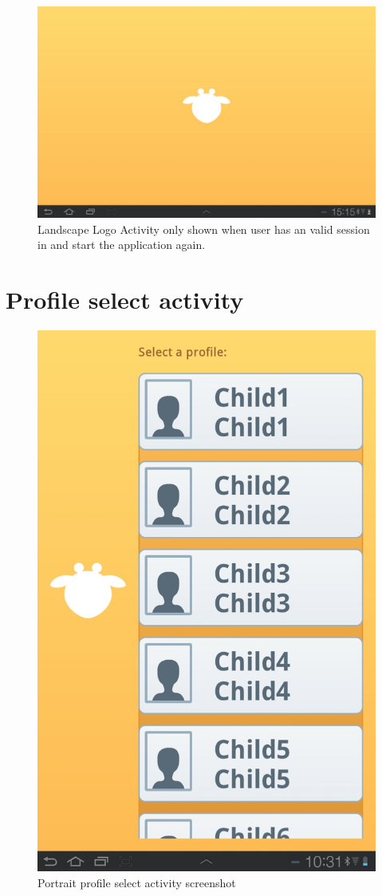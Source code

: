 \begin{figure}[h!]
	\centering
	\includegraphics[scale=0.3]{gfx/logo-activity_2.jpg}
	\caption{Landscape Logo Activity only shown when user has an valid session in and start the application again.}
	\label{fig:logo-activity_2}
\end{figure}
\section{Profile select activity}
\begin{figure}[h!]
	\centering
	\includegraphics[scale=0.3]{gfx/profile-select-activity_1.jpg}
	\caption{Portrait profile select activity screenshot}
	\label{fig:profile-select-activity_1}
\end{figure}